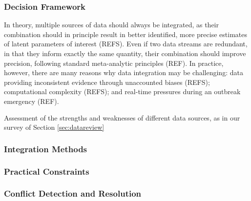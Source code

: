 \documentclass{article}
\begin{document}
\subsubsection{Decision Framework}
In theory, multiple sources of data should always be integrated, as their combination should in principle result in better identified, more precise estimates of latent parameters of interest (REFS). Even if two data streams are redundant, in that they inform exactly the same quantity, their combination should improve precision, following standard meta-analytic principles (REF). In practice, however, there are many reasons why data integration may be challenging: data providing inconsistent evidence through unaccounted biases (REFS); computational complexity (REFS); and real-time pressures during an outbreak emergency (REF).

Assessment of the strengths and weaknesses of different data sources, as in our survey of Section \ref{sec:datareview}

\subsubsection{Integration Methods}

\subsubsection{Practical Constraints}

\subsubsection{Conflict Detection and Resolution}
\end{document}
